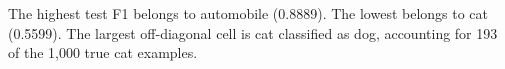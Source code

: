 The highest test F1 belongs to automobile (0.8889). The lowest belongs to cat (0.5599). The largest off-diagonal cell is cat classified as dog, accounting for 193 of the 1,000 true cat examples.
